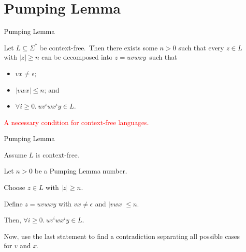 \documentclass{beamer}
\def\r{\textcolor{red}}
\begin{document}
\section{Pumping Lemma}

\begin{frame}{Pumping Lemma}
    \begin{lemma}
        Let $L \subseteq \Sigma^*$ be context-free.\pause\ Then there exists some $n > 0$ such that every $z \in L$ with $|z| \geq n$ can be decomposed into $z = uvwxy$\pause\ such that
        \begin{itemize}
            \item $vx \neq \epsilon$\pause;
            \item $|vwx| \leq n$\pause; and
            \item $\forall i \geq 0.\ uv^iwx^iy \in L$.
        \end{itemize}
    \end{lemma}\pause
    \r{A necessary condition for context-free languages.}
\end{frame}

\begin{frame}{Pumping Lemma}
    \begin{example}
        Assume $L$ is context-free.\par
        Let $n > 0$ be a Pumping Lemma number.\pause\par
        Choose $z \in L$ with $|z| \geq n$.\par
        Define $z = uvwxy$ with $vx \neq \epsilon$ and $|vwx| \leq n$.\pause\par
        Then, $\forall i \geq 0.\ uv^iwx^iy \in L$.\pause\par
        Now, use the last statement to find a contradiction separating all possible cases for $v$ and $x$.
    \end{example}
\end{frame}
\end{document}
